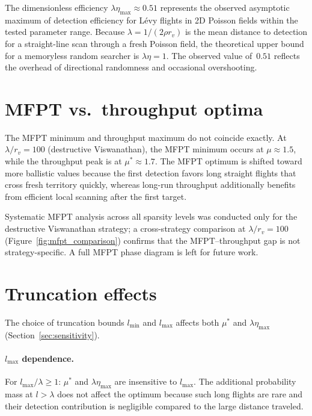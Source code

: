 The dimensionless efficiency $\lambda\eta_{\max} \approx 0.51$
represents the observed asymptotic maximum of detection
efficiency for L\'evy flights in 2D Poisson fields within the
tested parameter range.  Because $\lambda = 1/(2\rho r_v)$ is the
mean distance to detection for a straight-line scan through a fresh
Poisson field, the theoretical upper bound for a memoryless random
searcher is $\lambda\eta = 1$.  The observed value of~$0.51$
reflects the overhead of directional randomness and occasional
overshooting.

\section{MFPT vs.\ throughput optima}

The MFPT minimum and throughput maximum do not coincide
exactly.  At $\lambda/r_v = 100$ (destructive Viswanathan),
the MFPT minimum occurs at $\mu \approx 1.5$, while
the throughput peak is at $\mu^* \approx 1.7$.  The MFPT
optimum is shifted toward more ballistic values because the
first detection favors long straight flights that cross fresh
territory quickly, whereas long-run throughput additionally
benefits from efficient local scanning after the first target.

Systematic MFPT analysis across all sparsity levels was conducted
only for the destructive Viswanathan strategy; a cross-strategy
comparison at $\lambda/r_v = 100$
(Figure~\ref{fig:mfpt_comparison}) confirms that the
MFPT--throughput gap is not strategy-specific.
A full MFPT phase diagram is left for future work.

\section{Truncation effects}

The choice of truncation bounds $l_{\min}$ and $l_{\max}$
affects both $\mu^*$ and $\lambda\eta_{\max}$
(Section~\ref{sec:sensitivity}).

\paragraph{$l_{\max}$ dependence.}
For $l_{\max}/\lambda \geq 1$: $\mu^*$ and $\lambda\eta_{\max}$
are insensitive to $l_{\max}$.  The additional probability mass
at $l > \lambda$ does not affect the optimum because such long
flights are rare and their detection contribution is negligible
compared to the large distance traveled.

